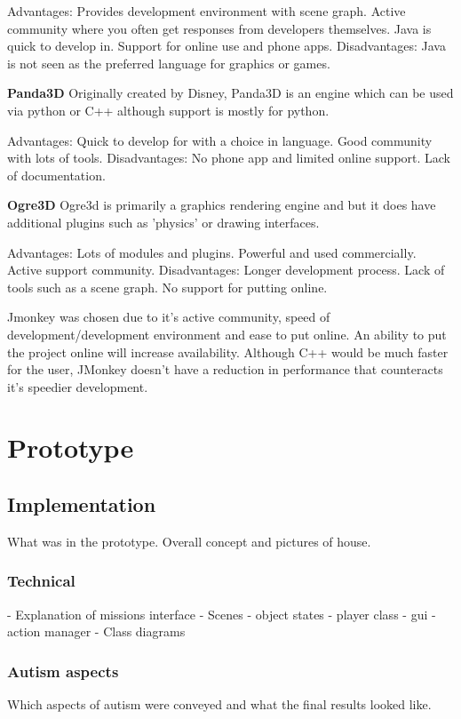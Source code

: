 \documentclass[11pt]{report}
\begin{document}
Advantages: Provides development environment with scene graph. Active community where you often get responses from developers themselves. Java is quick to develop in. Support for online use and phone apps.
Disadvantages: Java is not seen as the preferred language for graphics or games.

\textbf{Panda3D}
Originally created by Disney, Panda3D is an engine which can be used via python or C++ although support is mostly for python.

Advantages: Quick to develop for with a choice in language. Good community with lots of tools.
Disadvantages: No phone app and limited online support. Lack of documentation. 

\textbf{Ogre3D}
Ogre3d is primarily a graphics rendering engine and but it does have additional plugins such as 'physics' or drawing interfaces.

Advantages: Lots of modules and plugins. Powerful and used commercially. Active support community.
Disadvantages: Longer development process. Lack of tools such as a scene graph. No support for putting online.

Jmonkey was chosen due to it's active community, speed of development/development environment and ease to put online. An ability to put the project online will increase availability. Although C++ would be much faster for the user, JMonkey doesn't have a reduction in performance that counteracts it's speedier development. 


\chapter{Prototype}

\section{Implementation}
What was in the prototype. Overall concept and pictures of house.

\subsection{Technical}
- Explanation of missions interface
- Scenes
- object states
- player class
- gui
- action manager
- Class diagrams

\subsection{Autism aspects}
Which aspects of autism were conveyed and what the final results looked like.
\end{document}
